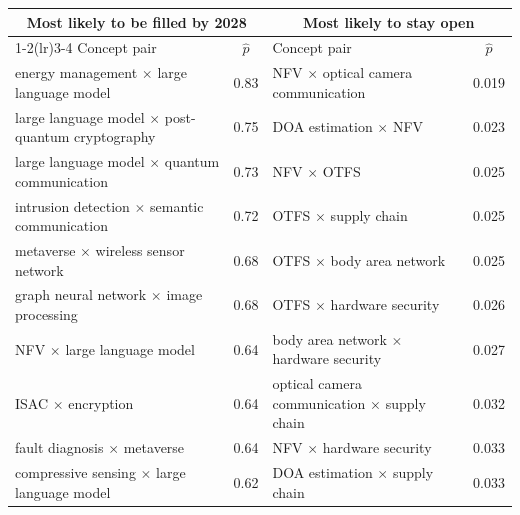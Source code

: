\begin{tabular}{lc@{\hspace{12pt}}lc}
\toprule
\multicolumn{2}{c}{Most likely to be filled by 2028} & \multicolumn{2}{c}{Most likely to stay open}\\
\cmidrule(lr){1-2}\cmidrule(lr){3-4}
Concept pair & $\hat p$ & Concept pair & $\hat p$\\
\midrule
energy management $\times$ large language model & 0.83 & NFV $\times$ optical camera communication & 0.019\\
large language model $\times$ post-quantum cryptography & 0.75 & DOA estimation $\times$ NFV & 0.023\\
large language model $\times$ quantum communication & 0.73 & NFV $\times$ OTFS & 0.025\\
intrusion detection $\times$ semantic communication & 0.72 & OTFS $\times$ supply chain & 0.025\\
metaverse $\times$ wireless sensor network & 0.68 & OTFS $\times$ body area network & 0.025\\
graph neural network $\times$ image processing & 0.68 & OTFS $\times$ hardware security & 0.026\\
NFV $\times$ large language model & 0.64 & body area network $\times$ hardware security & 0.027\\
ISAC $\times$ encryption & 0.64 & optical camera communication $\times$ supply chain & 0.032\\
fault diagnosis $\times$ metaverse & 0.64 & NFV $\times$ hardware security & 0.033\\
compressive sensing $\times$ large language model & 0.62 & DOA estimation $\times$ supply chain & 0.033\\
\bottomrule
\end{tabular}